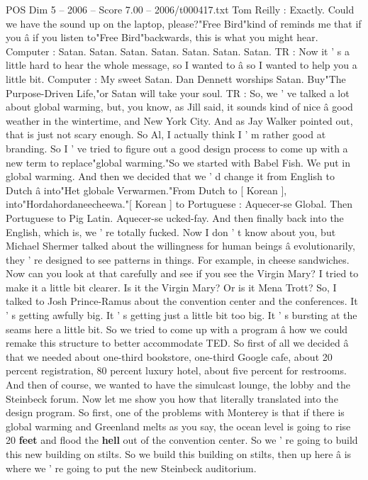\begin{textsample}{POS Dim 5 – 2006 – Score 7.00 – 2006/t000417.txt}
Tom Reilly : Exactly.
Could we have the sound up on the laptop, please?"Free Bird"kind of reminds me that if you â if you listen to"Free Bird"backwards, this is what you might hear.
Computer : Satan.
Satan.
Satan.
Satan.
Satan.
Satan.
Satan.
TR : Now it ' s a little hard to hear the whole message, so I wanted to â so I wanted to help you a little bit.
Computer : My sweet Satan.
Dan Dennett worships Satan.
Buy"The Purpose-Driven Life,"or Satan will take your soul.
TR : So, we ' ve talked a lot about global warming, but, you know, as Jill said, it sounds kind of nice â good weather in the wintertime, and New York City.
And as Jay Walker pointed out, that is just not scary enough.
So Al, I actually think I ' m rather good at branding.
So I ' ve tried to figure out a good design process to come up with a new term to replace"global warming."So we started with Babel Fish.
We put in global warming.
And then we decided that we ' d change it from English to Dutch â into"Het globale Verwarmen."From Dutch to [ Korean ], into"Hordahordaneecheewa."[ Korean ] to Portuguese : Aquecer-se Global.
Then Portuguese to Pig Latin.
Aquecer-se ucked-fay.
And then finally back into the English, which is, we ' re totally fucked.
Now I don ' t know about you, but Michael Shermer talked about the willingness for human beings â evolutionarily, they ' re designed to see patterns in things.
For example, in cheese sandwiches.
Now can you look at that carefully and see if you see the Virgin Mary?
I tried to make it a little bit clearer.
Is it the Virgin Mary?
Or is it Mena Trott?
So, I talked to Josh Prince-Ramus about the convention center and the conferences.
It ' s getting awfully big.
It ' s getting just a little bit too big.
It ' s bursting at the seams here a little bit.
So we tried to come up with a program â how we could remake this structure to better accommodate TED.
So first of all we decided â that we needed about one-third bookstore, one-third Google cafe, about 20 percent registration, 80 percent luxury hotel, about five percent for restrooms.
And then of course, we wanted to have the simulcast lounge, the lobby and the Steinbeck forum.
Now let me show you how that literally translated into the design program.
So first, one of the problems with Monterey is that if there is global warming and Greenland melts as you say, the ocean level is going to rise 20 \textbf{feet} and flood the \textbf{hell} out of the convention center.
So we ' re going to build this new building on stilts.
So we build this building on stilts, then up here â is where we ' re going to put the new Steinbeck auditorium.

\end{textsample}
